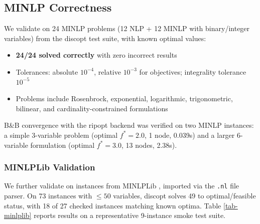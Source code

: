 \documentclass[12pt,preprint]{article}
\begin{document}
\subsection{MINLP Correctness}
\label{org-minlp-correctness}
We validate on 24 MINLP problems (12 NLP + 12 MINLP with binary/integer variables) from the discopt test suite, with known optimal values:


\begin{itemize}
\item \textbf{24/24 solved correctly} with zero incorrect results

\item Tolerances: absolute $10^{-4}$, relative $10^{-3}$ for objectives; integrality tolerance $10^{-5}$

\item Problems include Rosenbrock, exponential, logarithmic, trigonometric, bilinear, and cardinality-constrained formulations

\end{itemize}


B\&B convergence with the ripopt backend was verified on two MINLP instances: a simple 3-variable problem (optimal $f^* = 2.0$, 1 node, 0.039s) and a larger 6-variable formulation (optimal $f^* = 3.0$, 13 nodes, 2.38s).

\subsubsection{MINLPLib Validation}
\label{org-minlplib-validation}
We further validate on instances from MINLPLib \cite{Bussieck2003}, imported via the \texttt{.nl} file parser. On 73 instances with $\le 50$ variables, discopt solves 49 to optimal/feasible status, with 18 of 27 checked instances matching known optima. Table \ref{tab-minlplib} reports results on a representative 9-instance smoke test suite.
\end{document}
